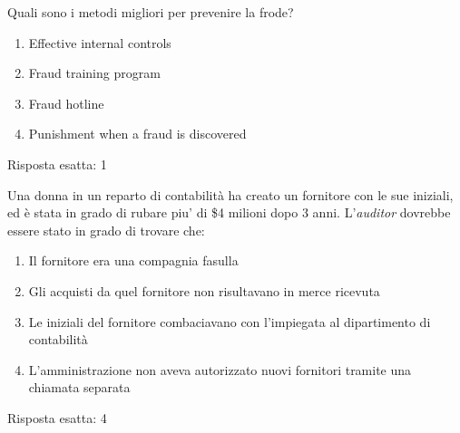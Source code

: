 \label{EsFrodi2}

\begin{Exercise} [
  title={Prevenzione di una frode},
  label={fr4}
 ]

 \Question Quali sono i metodi migliori per prevenire la frode?
\begin{enumerate}
  \item Effective internal controls
  \item Fraud training program
  \item Fraud hotline
  \item Punishment when a fraud is discovered
\end{enumerate}

\end{Exercise}

\begin{Answer} [
   ref={fr4},
   number={4}
 ]

  \Question Risposta esatta: 1

\end{Answer}


\begin{Exercise} [
  title={Prevenzione di una frode},
  label={fr5}
 ]

 \Question Una donna in un reparto di contabilità ha creato un fornitore con le
sue iniziali, ed è stata in grado di rubare piu' di \$4 milioni dopo 3 anni.
L'\textit{auditor} dovrebbe essere stato in grado di trovare che:
\begin{enumerate}
 \item Il fornitore era una compagnia fasulla
 \item Gli acquisti da quel fornitore non risultavano in merce ricevuta
 \item Le iniziali del fornitore combaciavano con l'impiegata al dipartimento
di contabilità
 \item L'amministrazione non aveva autorizzato nuovi fornitori tramite una
chiamata separata
\end{enumerate}

\end{Exercise}

\begin{Answer} [
  ref={fr5},
  number={5}
 ]

 \Question Risposta esatta: 4
\end{Answer}





